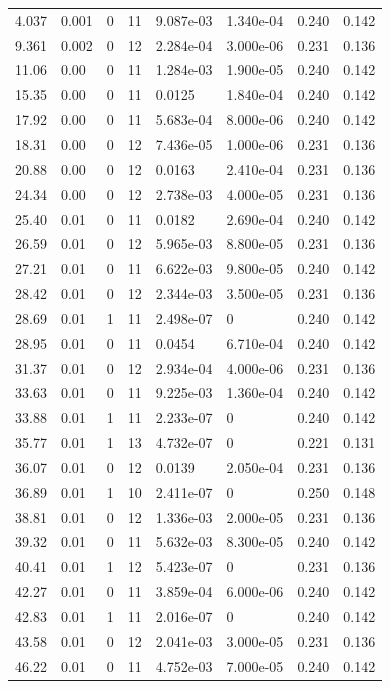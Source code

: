 \documentclass[preview]{standalone}
\begin{document}
{{\begin{tabular}{L{1.2cm}C{1.2cm} C{0.3cm}C{0.5cm} C{1.4cm}C{1.4cm} C{1.4cm}C{1.4cm}}
  4.037  &  0.001  & 0     & 11 &  9.087e-03  & 1.340e-04  & 0.240 &  0.142   \\ 
  9.361  &  0.002  & 0     & 12 &  2.284e-04  & 3.000e-06  & 0.231 &  0.136   \\ 
  11.06  &  0.00  & 0     & 11 &  1.284e-03  & 1.900e-05  & 0.240 &  0.142   \\ 
  15.35  &  0.00  & 0     & 11 &  0.0125  & 1.840e-04  & 0.240 &  0.142   \\ 
  17.92  &  0.00  & 0     & 11 &  5.683e-04  & 8.000e-06  & 0.240 &  0.142   \\ 
  18.31  &  0.00  & 0     & 12 &  7.436e-05  & 1.000e-06  & 0.231 &  0.136   \\ 
  20.88  &  0.00  & 0     & 12 &  0.0163  & 2.410e-04  & 0.231 &  0.136   \\ 
  24.34  &  0.00  & 0     & 12 &  2.738e-03  & 4.000e-05  & 0.231 &  0.136   \\ 
  25.40  &  0.01  & 0     & 11 &  0.0182  & 2.690e-04  & 0.240 &  0.142   \\ 
  26.59  &  0.01  & 0     & 12 &  5.965e-03  & 8.800e-05  & 0.231 &  0.136   \\ 
  27.21  &  0.01  & 0     & 11 &  6.622e-03  & 9.800e-05  & 0.240 &  0.142   \\ 
  28.42  &  0.01  & 0     & 12 &  2.344e-03  & 3.500e-05  & 0.231 &  0.136   \\ 
  28.69  &  0.01  & 1     & 11 &  2.498e-07  & 0  & 0.240 &  0.142   \\ 
  28.95  &  0.01  & 0     & 11 &  0.0454  & 6.710e-04  & 0.240 &  0.142   \\ 
  31.37  &  0.01  & 0     & 12 &  2.934e-04  & 4.000e-06  & 0.231 &  0.136   \\ 
  33.63  &  0.01  & 0     & 11 &  9.225e-03  & 1.360e-04  & 0.240 &  0.142   \\ 
  33.88  &  0.01  & 1     & 11 &  2.233e-07  & 0  & 0.240 &  0.142   \\ 
  35.77  &  0.01  & 1     & 13 &  4.732e-07  & 0  & 0.221 &  0.131   \\ 
  36.07  &  0.01  & 0     & 12 &  0.0139  & 2.050e-04  & 0.231 &  0.136   \\ 
  36.89  &  0.01  & 1     & 10 &  2.411e-07  & 0  & 0.250 &  0.148   \\ 
  38.81  &  0.01  & 0     & 12 &  1.336e-03  & 2.000e-05  & 0.231 &  0.136   \\ 
  39.32  &  0.01  & 0     & 11 &  5.632e-03  & 8.300e-05  & 0.240 &  0.142   \\ 
  40.41  &  0.01  & 1     & 12 &  5.423e-07  & 0  & 0.231 &  0.136   \\ 
  42.27  &  0.01  & 0     & 11 &  3.859e-04  & 6.000e-06  & 0.240 &  0.142   \\ 
  42.83  &  0.01  & 1     & 11 &  2.016e-07  & 0  & 0.240 &  0.142   \\ 
  43.58  &  0.01  & 0     & 12 &  2.041e-03  & 3.000e-05  & 0.231 &  0.136   \\ 
  46.22  &  0.01  & 0     & 11 &  4.752e-03  & 7.000e-05  & 0.240 &  0.142   \\ 
\hline 
\end{tabular} 

}}
\end{document}
